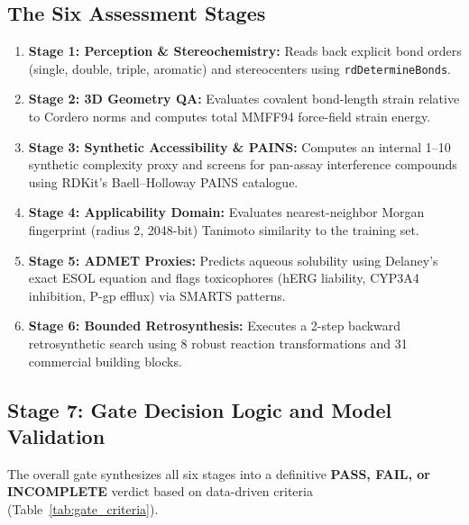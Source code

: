 \documentclass[12pt, a4paper]{article}
\begin{document}
\subsection{The Six Assessment Stages}
\begin{enumerate}[leftmargin=*]
    \item \textbf{Stage 1: Perception \& Stereochemistry:} Reads back explicit bond orders (single, double, triple, aromatic) and stereocenters using \texttt{rdDetermineBonds}.
    \item \textbf{Stage 2: 3D Geometry QA:} Evaluates covalent bond-length strain relative to Cordero norms and computes total MMFF94 force-field strain energy.
    \item \textbf{Stage 3: Synthetic Accessibility \& PAINS:} Computes an internal 1--10 synthetic complexity proxy and screens for pan-assay interference compounds using RDKit's Baell--Holloway PAINS catalogue.
    \item \textbf{Stage 4: Applicability Domain:} Evaluates nearest-neighbor Morgan fingerprint (radius 2, 2048-bit) Tanimoto similarity to the training set.
    \item \textbf{Stage 5: ADMET Proxies:} Predicts aqueous solubility using Delaney's exact ESOL equation and flags toxicophores (hERG liability, CYP3A4 inhibition, P-gp efflux) via SMARTS patterns.
    \item \textbf{Stage 6: Bounded Retrosynthesis:} Executes a 2-step backward retrosynthetic search using 8 robust reaction transformations and 31 commercial building blocks.
\end{enumerate}

\subsection{Stage 7: Gate Decision Logic and Model Validation}
The overall gate synthesizes all six stages into a definitive \textbf{PASS, FAIL, or INCOMPLETE} verdict based on data-driven criteria (Table~\ref{tab:gate_criteria}).
\end{document}
